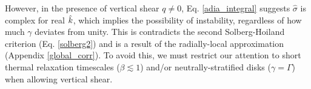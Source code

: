 
However, in the presence of vertical shear $q\neq0$,
Eq. \ref{adia_integral} suggests $\hat{\sigma}$ is complex for real
$\hat{k}$, which implies the possibility of instability, regardless of
how much $\gamma$ deviates from unity. This is contradicts the second 
Solberg-Hoiland criterion (Eq. \ref{solberg2}) and is a result of the
radially-local approximation (Appendix \ref{global_corr}). To 
avoid this, we must restrict our attention to short thermal relaxation
timescales ($\beta\lesssim1$) and/or neutrally-stratified disks
($\gamma=\Gamma$) when allowing vertical shear. 





